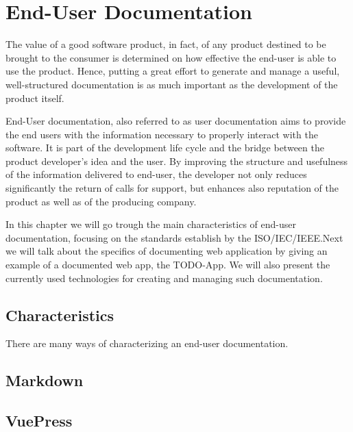 \chapter{End-User Documentation}\label{ch:userDoc}
The value of a good software product, in fact, of any product destined to be brought to the consumer is determined on how effective the end-user is able to use the product. Hence, putting a great effort to generate and manage a useful, well-structured documentation is as much important as the development of the product itself.

End-User documentation, also referred to as user documentation aims to provide the end users with the information necessary to properly interact with the software. It is part of the development life cycle and the bridge between the product developer's idea and the user. By improving the structure and usefulness of the information delivered to end-user, the developer not only reduces significantly the return of calls for support, but enhances also reputation of the product as well as of the producing company\cite{8584518}.

In this chapter we will go trough the main characteristics of end-user documentation, focusing on the standards establish by the ISO/IEC/IEEE.\@ Next we will talk about the specifics of documenting web application by giving an example of a documented web app, the TODO-App. We will also present the currently used technologies for creating and managing such documentation.

\section{Characteristics}\label{sec:char}
There are many ways of characterizing an end-user documentation.
\section{Markdown}\label{sec:MD}
\section{VuePress}\label{sec:VP}
